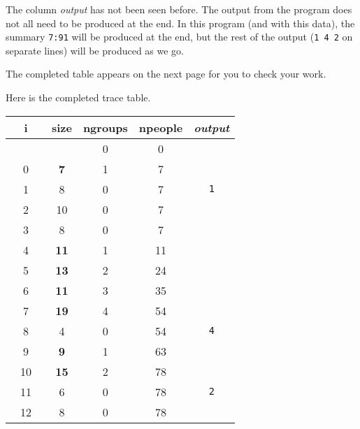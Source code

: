 The column \emph{output} has not been seen before. The output from the program does not
all need to be produced at the end. In this program (and with this data), the summary
\texttt{7:91} will be produced at the end, but the rest of the output (\texttt{1 4 2} on
separate lines) will be produced as we go.

The completed table appears on the next page for you to check your work.


\clearpage %

Here is the completed trace table.

\begin{inlinetable}
  \begin{tabular}{S[table-format=2.0]S[table-format=2.0]S[table-format=3.0]S[table-format=3.0]c}
    \toprule
    {~~i~~} & {size} & {ngroups} & {npeople} & {\emph{output}} \\
    \midrule
            &              & 0         & 0         &                 \\
    0       & \bfseries 7  & 1         & 7         &                 \\
    1       & 8            & 0         & 7         & \texttt{1}      \\
    2       & 10           & 0         & 7         &                 \\
    3       & 8            & 0         & 7         &                 \\
    4       & \bfseries 11 & 1         & 11        &                 \\
    5       & \bfseries 13 & 2         & 24        &                 \\
    6       & \bfseries 11 & 3         & 35        &                 \\
    7       & \bfseries 19 & 4         & 54        &                 \\
    8       & 4            & 0         & 54        & \texttt{4}      \\
    9       & \bfseries 9  & 1         & 63        &                 \\
    10      & \bfseries 15 & 2         & 78        &                 \\
    11      & 6            & 0         & 78        & \texttt{2}      \\
    12      & 8            & 0         & 78        &                 \\
    \bottomrule
  \end{tabular}
\end{inlinetable}


